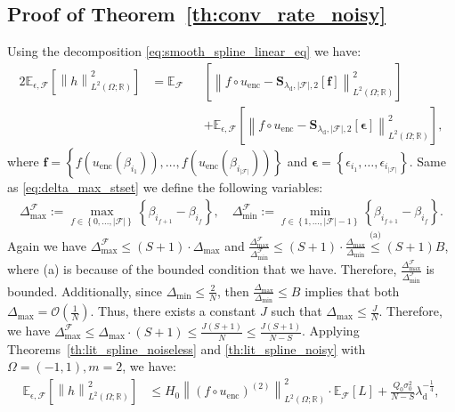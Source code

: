 \documentclass{article}
\def\encs{u_\textrm{enc}}
\def\declamb{\lambda_\textrm{d}}
\def\stset{\mathcal{F}}
\newcommand{\norm}[1]{\left\lVert#1\right\rVert}
\newcommand{\lp}[1]{{L}^{#1}\left(\Omega; \mathbb{R}\right)}
\newcommand{\splineCC}{\mathbf{S}_{\declamb,|\stset|,2}}
\newcommand{\lec}[2]{\stackrel{\text{#1}}{#2}}
\begin{document}
\subsection{Proof of Theorem~\ref{th:conv_rate_noisy}}\label{sec:proof_noisy}
Using the decomposition \eqref{eq:smooth_spline_linear_eq} we have:
\begin{alignat}{2}
    \mathbb{E}_{\epsilon, \stset}\left[\norm{h}^2_{\lp{2}}\right] &= \mathbb{E}_{\stset}&&\left[\norm{f\circ\encs - \splineCC[\mathbf{f}]}^2_{\lp{2}}\right] \nonumber \\ & &&+  \mathbb{E}_{\epsilon, \stset}\left[\norm{f\circ\encs - \splineCC[\bm{\epsilon}]}^2_{\lp{2}}\right],
\end{alignat}
where $\mathbf{f}=\left\{f(\encs(\beta_{i_1})),\dots,f(\encs(\beta_{i_{|\stset|}}))\right\}$ and $\bm{\epsilon} = \left\{\epsilon_{i_1},\dots, \epsilon_{i_{|\stset|}}\right\}$. Same as \eqref{eq:delta_max_stset} we define the following variables:
\begin{align}
\Delta^\stset_\textrm{max}:=\underset{f \in \left\{0,\dots,|\stset|\right\}}{\max} \left\{\beta_{i_{f+1}}-\beta_{i_f}\right\}, \quad \Delta^\stset_\textrm{min}:=\underset{f \in \left\{1,\dots,|\stset|-1\right\}}{\min} \left\{\beta_{i_{f+1}}-\beta_{i_f}\right\}.
\end{align}
Again we have $\Delta^\stset_\textrm{max} \leqslant (S+1) \cdot \Delta_\textrm{max}$ and $ \frac{\Delta^\stset_\textrm{max}}{\Delta^\stset_\textrm{min}} \leqslant (S+1)\cdot\frac{\Delta_\textrm{max}}
{\Delta_\textrm{min}} \lec{(a)}{\leqslant} (S+1)B$, where (a) is because of the bounded condition that we have. Therefore, $\frac{\Delta^\stset_\textrm{max}}{\Delta^\stset_\textrm{min}}$ is bounded. Additionally, since $\Delta_\textrm{min} \leqslant \frac{2}{N}$, then $\frac{\Delta_\textrm{max}}{\Delta_\textrm{min}} \leqslant B$ implies that both $\Delta_\textrm{max} = \mathcal{O}(\frac{1}{N})$. Thus, there exists a constant $J$ such that $\Delta_\textrm{max} \leqslant \frac{J}{N}$. Therefore, we have $\Delta^\stset_\textrm{max} \leqslant \Delta_\textrm{max}\cdot (S+1) \leqslant \frac{J(S+1)}{N} \leqslant \frac{J(S+1)}{N-S}$.
Applying Theorems~\ref{th:lit_spline_noiseless} and \ref{th:lit_spline_noisy} with $\Omega=(-1, 1), m=2$, we have:
\begin{align}\label{eq:h_2}
    \mathbb{E}_{\epsilon, \stset}\left[\norm{h}^2_{\lp{2}}\right] &\lec{}{\leqslant}H_0\norm{(f\circ\encs)^{(2)}}^2_{\lp{2}}\cdot\mathbb{E}_{\stset}\left[L\right] + \frac{Q_0\sigma_0^2}{N-S}\declamb^{-\frac{1}{4}},
\end{align}
\end{document}

